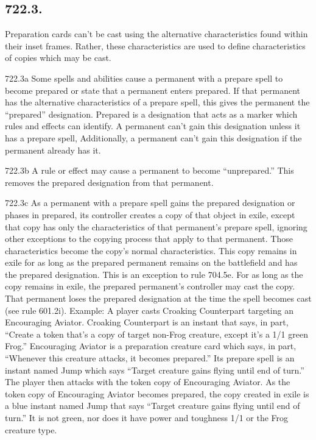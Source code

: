 \subsection*{722.3.}
Preparation cards can’t be cast using the alternative characteristics found within their inset frames. Rather, these characteristics are used to define characteristics of copies which may be cast.

722.3a Some spells and abilities cause a permanent with a prepare spell to become prepared or state that a permanent enters prepared. If that permanent has the alternative characteristics of a prepare spell, this gives the permanent the “prepared” designation. Prepared is a designation that acts as a marker which rules and effects can identify. A permanent can’t gain this designation unless it has a prepare spell, Additionally, a permanent can’t gain this designation if the permanent already has it.

722.3b A rule or effect may cause a permanent to become “unprepared.” This removes the prepared designation from that permanent.

722.3c As a permanent with a prepare spell gains the prepared designation or phases in prepared, its controller creates a copy of that object in exile, except that copy has only the characteristics of that permanent’s prepare spell, ignoring other exceptions to the copying process that apply to that permanent. Those characteristics become the copy’s normal characteristics. This copy remains in exile for as long as the prepared permanent remains on the battlefield and has the prepared designation. This is an exception to rule 704.5e. For as long as the copy remains in exile, the prepared permanent’s controller may cast the copy. That permanent loses the prepared designation at the time the spell becomes cast (see rule 601.2i).
Example: A player casts Croaking Counterpart targeting an Encouraging Aviator. Croaking Counterpart is an instant that says, in part, “Create a token that’s a copy of target non-Frog creature, except it’s a 1/1 green Frog.” Encouraging Aviator is a preparation creature card which says, in part, “Whenever this creature attacks, it becomes prepared.” Its prepare spell is an instant named Jump which says “Target creature gains flying until end of turn.” The player then attacks with the token copy of Encouraging Aviator. As the token copy of Encouraging Aviator becomes prepared, the copy created in exile is a blue instant named Jump that says “Target creature gains flying until end of turn.” It is not green, nor does it have power and toughness 1/1 or the Frog creature type.

